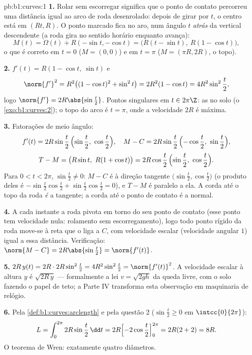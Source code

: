 \begin{solution}{pb:b1:curves:1}
\textbf{1.} Rolar sem escorregar significa que o ponto de contato
percorreu uma distância igual ao arco de roda desenrolado: depois de
girar por $t$, o centro está em $(Rt, R)$. O ponto marcado fica no
aro, num ângulo $t$ \emph{atrás} da vertical descendente (a roda gira
no sentido horário enquanto avança):
\[
M(t) = \Omega(t) + R(-\sin t, -\cos t)
= \bigl(R(t - \sin t),\ R(1 - \cos t)\bigr),
\]
o que é correto em $t = 0$ ($M = (0,0)$) e em $t = \pi$ ($M =
(\pi R, 2R)$, o topo).

\textbf{2.} $f'(t) = R(1 - \cos t,\ \sin t)$ e
\[
\norm{f'}^2 = R^2\bigl((1-\cos t)^2 + \sin^2 t\bigr)
= 2R^2(1 - \cos t) = 4R^2\sin^2\frac t2 ,
\]
logo $\norm{f'} = 2R\abs{\sin\frac t2}$. Pontos singulares em $t \in
2\pi\Z$: as  no solo
(o \cref{exo:b1:curves:2}); o topo do arco é $t = \pi$, onde a velocidade $2R$ é
máxima.

\textbf{3.} Fatorações de meio ângulo:
\[
f'(t) = 2R\sin\frac t2\,\Bigl(\sin\frac t2,\ \cos\frac t2\Bigr),
\quad
M - C = 2R\sin\frac t2\,\Bigl(-\cos\frac t2,\ \sin\frac t2\Bigr),
\]
\[
T - M = \bigl(R\sin t,\ R(1 + \cos t)\bigr)
= 2R\cos\frac t2\,\Bigl(\sin\frac t2,\ \cos\frac t2\Bigr).
\]
Para $0 < t < 2\pi$, $\sin\frac t2 \neq 0$: $M - C$ é  à direção tangente $\bigl(\sin\frac t2, \cos\frac
t2\bigr)$ (o
produto deles é $-\sin\frac t2\cos\frac t2 +
\sin\frac t2\cos\frac t2 = 0$), e $T - M$ é paralelo a ela. A corda até o
topo da roda \emph{é} a tangente; a corda até o ponto de contato é a
normal.

\textbf{4.} A cada instante a roda pivota em torno do seu ponto de
contato (esse ponto tem velocidade nula: rolamento sem
escorregamento), logo todo ponto rígido da roda move-se
 à reta que o liga a $C$, com velocidade escalar
(velocidade angular $1$) igual a essa distância. Verificação: $\norm{M - C} = 2R\abs{\sin\frac t2} =
\norm{f'(t)}$.

\textbf{5.} $2R\,y(t) = 2R\cdot 2R\sin^2\frac t2 =
4R^2\sin^2\frac t2 = \norm{f'(t)}^2$. A velocidade escalar à altura $y$ é $\sqrt{2R\,y}$ ---
formalmente a lei $v = \sqrt{2gh}$ da queda livre, com o solo fazendo o papel de
teto; a Parte IV transforma esta observação em maquinaria de relógio.

\textbf{6.} Pela \cref{def:b1:curves:arclength} e pela questão 2 ($\sin\frac t2 \geq 0$ em $\intcc{0}{2\pi}$):
\[
L = \int_0^{2\pi} 2R\sin\frac t2\,\dd t
= 2R\Bigl[-2\cos\frac t2\Bigr]_0^{2\pi} = 2R(2 + 2) = 8R .
\]
O teorema de Wren: exatamente quatro diâmetros.


\end{solution}
